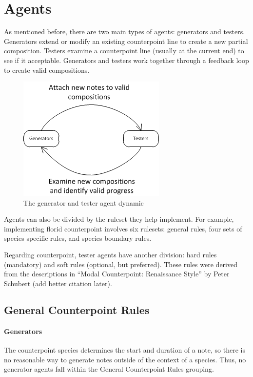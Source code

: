 \section{Agents}

As mentioned before, there are two main types of agents: generators and testers.
Generators extend or modify an existing counterpoint line to create a new partial composition.
Testers examine a counterpoint line (usually at the current end) to see if it acceptable.
Generators and testers work together through a feedback loop to create valid compositions.

\begin{figure}[h]
\caption{The generator and tester agent dynamic}
\centering
	\includegraphics[keepaspectratio=true]{generator-and-tester-dynamic.png}
\end{figure}

Agents can also be divided by the ruleset they help implement.
For example, implementing florid counterpoint involves six rulesets: general rules, four sets of species specific rules, and species boundary rules.

Regarding counterpoint, tester agents have another division: hard rules (mandatory) and soft rules (optional, but preferred).
These rules were derived from the descriptions in ``Modal Counterpoint: Renaissance Style'' by Peter Schubert (add better citation later).

\subsection{General Counterpoint Rules}

\paragraph{Generators}
The counterpoint species determines the start and duration of a note, so there is no reasonable way to generate notes outside of the context of a species.
Thus, no generator agents fall within the General Counterpoint Rules grouping.

